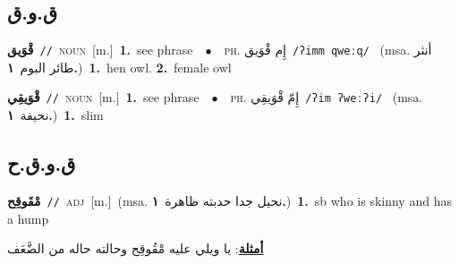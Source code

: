 \documentclass[10pt,a4paper,twoside]{article} %
\begin{document}
\begin{multicols}{2}
\vspace{-3mm}
\subsection*{\color{blue}\foreignlanguage{arabic}{ق.و.ق}\color{blue}{}} 

{\setlength\topsep{0pt}\textbf{\foreignlanguage{arabic}{قْوَيق}}\ {\color{gray}\texttt{//}\color{black}}\ \textsc{noun}\ [m.]\ \textbf{1.}~see phrase\ \ $\bullet$\ \ \textsc{ph.} \color{gray} \foreignlanguage{arabic}{إِم قْوَيق}\color{black}\ {\color{gray}\texttt{/{\sffamily ʔimm qweːq}/}\color{black}}\ \color{gray} (msa. \foreignlanguage{arabic}{أنثر طائر البوم}~\foreignlanguage{arabic}{\textbf{١.}})\color{black}\ \textbf{1.}~hen owl.  \textbf{2.}~female owl\ } \vspace{2mm}

{\setlength\topsep{0pt}\textbf{\foreignlanguage{arabic}{قْوَيقِي}}\ {\color{gray}\texttt{//}\color{black}}\ \textsc{noun}\ [m.]\ \textbf{1.}~see phrase\ \ $\bullet$\ \ \textsc{ph.} \color{gray} \foreignlanguage{arabic}{إِمّ قْوَيقِي}\color{black}\ {\color{gray}\texttt{/{\sffamily ʔim ʔweːʔi}/}\color{black}}\ \color{gray} (msa. \foreignlanguage{arabic}{نحيفة}~\foreignlanguage{arabic}{\textbf{١.}})\color{black}\ \textbf{1.}~slim\ } \vspace{2mm}

\vspace{-3mm}
\subsection*{\color{blue}\foreignlanguage{arabic}{ق.و.ق.ح}\color{blue}{}} 

{\setlength\topsep{0pt}\textbf{\foreignlanguage{arabic}{مْقَوقِح}}\ {\color{gray}\texttt{//}\color{black}}\ \textsc{adj}\ [m.]\ \color{gray}(msa. \foreignlanguage{arabic}{نحيل جدا حدبته ظاهرة}~\foreignlanguage{arabic}{\textbf{١.}})\color{black}\ \textbf{1.}~sb who is skinny and has a hump\  \begin{flushright}\color{gray}\foreignlanguage{arabic}{\textbf{\underline{\foreignlanguage{arabic}{أمثلة}}}: يا ويلي عليه مْقُوقِح وحالته حاله من الضَّعَف}\end{flushright}\color{black}} \vspace{2mm}


\end{multicols}
\end{document}
